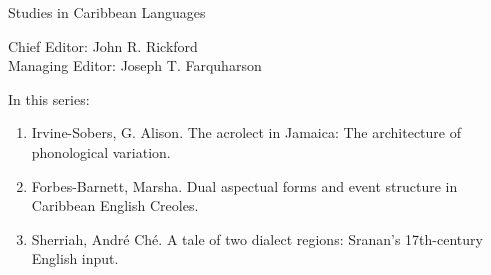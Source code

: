 {\large Studies in Caribbean Languages}

\bigskip

Chief Editor: John R. Rickford\\
Managing Editor: Joseph T. Farquharson

\bigskip

In this series:

\begin{enumerate}
\item Irvine-Sobers,  G. Alison. The acrolect in Jamaica: The architecture of phonological variation.
\item Forbes-Barnett, Marsha. Dual aspectual forms and event structure in Caribbean English Creoles.
\item Sherriah, André Ché. A tale of two dialect regions: Sranan’s 17th-century English input.
\end{enumerate}


\vfill

